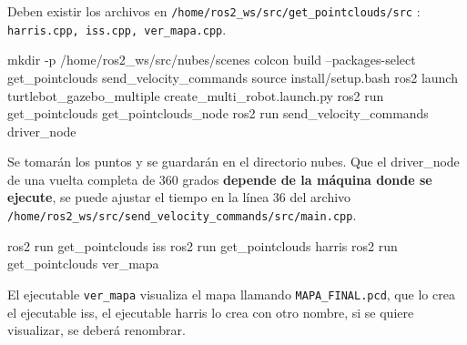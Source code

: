 \documentclass[11pt,letterpaper, onecolumn]{article}
\begin{document}
Deben existir los archivos en \texttt{/home/ros2\_ws/src/get\_pointclouds/src} : \texttt{harris.cpp, iss.cpp, ver\_mapa.cpp}.

\begin{terminal}{}
mkdir -p /home/ros2_ws/src/nubes/scenes
colcon build --packages-select get_pointclouds send_velocity_commands
source install/setup.bash
ros2 launch turtlebot_gazebo_multiple create_multi_robot.launch.py
ros2 run get_pointclouds get_pointclouds_node
ros2 run send_velocity_commands driver_node
\end{terminal}

Se tomarán los puntos y se guardarán en el directorio nubes. Que el driver\_node de una vuelta completa de 360 grados \textbf{depende de la máquina donde se ejecute}, se puede ajustar el tiempo en la línea 36 del archivo \texttt{/home/ros2\_ws/src/send\_velocity\_commands/src/main.cpp}.

\begin{terminal}{}
ros2 run get_pointclouds iss
ros2 run get_pointclouds harris
ros2 run get_pointclouds ver_mapa
\end{terminal}

El ejecutable \texttt{ver\_mapa} visualiza el mapa llamando \texttt{MAPA\_FINAL.pcd}, que lo crea el ejecutable iss, el ejecutable harris lo crea con otro nombre, si se quiere visualizar, se deberá renombrar. 

\newpage
\printbibliography
\end{document}

